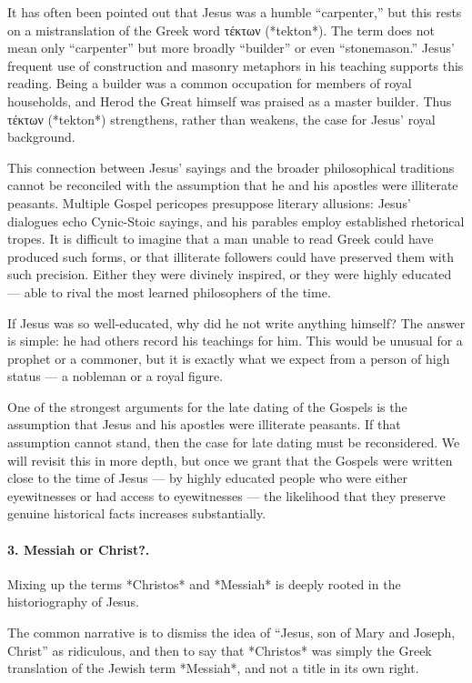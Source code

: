 It has often been pointed out that Jesus was a humble “carpenter,” but this rests on a mistranslation of the Greek word τέκτων (*tekton*).
The term does not mean only “carpenter” but more broadly “builder” or even “stonemason.”
Jesus’ frequent use of construction and masonry metaphors in his teaching supports this reading.
Being a builder was a common occupation for members of royal households, and Herod the Great himself was praised as a master builder.
Thus τέκτων (*tekton*) strengthens, rather than weakens, the case for Jesus’ royal background.

This connection between Jesus’ sayings and the broader philosophical traditions cannot be reconciled with the assumption that he and his apostles were illiterate peasants.
Multiple Gospel pericopes presuppose literary allusions: Jesus’ dialogues echo Cynic-Stoic sayings, and his parables employ established rhetorical tropes.
It is difficult to imagine that a man unable to read Greek could have produced such forms, or that illiterate followers could have preserved them with such precision.
Either they were divinely inspired, or they were highly educated — able to rival the most learned philosophers of the time.

If Jesus was so well-educated, why did he not write anything himself?
The answer is simple: he had others record his teachings for him.
This would be unusual for a prophet or a commoner, but it is exactly what we expect from a person of high status — a nobleman or a royal figure.

One of the strongest arguments for the late dating of the Gospels is the assumption that Jesus and his apostles were illiterate peasants.
If that assumption cannot stand, then the case for late dating must be reconsidered.
We will revisit this in more depth, but once we grant that the Gospels were written close to the time of Jesus — by highly educated people who were either eyewitnesses or had access to eyewitnesses — the likelihood that they preserve genuine historical facts increases substantially.

\paragraph{3.
Messiah or Christ?.}\label{par:messiah-or-christ}

Mixing up the terms *Christos* and *Messiah* is deeply rooted in the historiography of Jesus.

The common narrative is to dismiss the idea of “Jesus, son of Mary and Joseph, Christ” as ridiculous, and then to say that *Christos* was simply the Greek translation of the Jewish term *Messiah*, and not a title in its own right.

